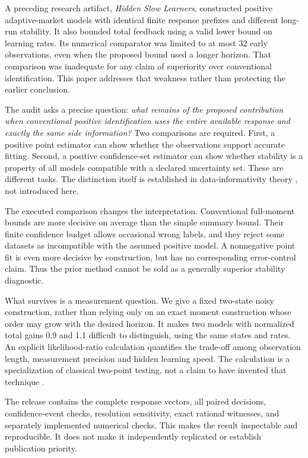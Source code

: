 \documentclass[11pt]{article}
\theoremstyle{remark}\newtheorem{remark}[proposition]{Remark}
\begin{document}
A preceding research artifact, \emph{Hidden Slow Learners}, constructed positive adaptive-market models with identical finite response prefixes and different long-run stability. It also bounded total feedback using a valid lower bound on learning rates. Its numerical comparator was limited to at most 32 early observations, even when the proposed bound used a longer horizon. That comparison was inadequate for any claim of superiority over conventional identification. This paper addresses that weakness rather than protecting the earlier conclusion.

The audit asks a precise question: \emph{what remains of the proposed contribution when conventional positive identification uses the entire available response and exactly the same side information?} Two comparisons are required. First, a positive point estimator can show whether the observations support accurate fitting. Second, a positive confidence-set estimator can show whether stability is a property of all models compatible with a declared uncertainty set. These are different tasks. The distinction itself is established in data-informativity theory \citep{vanwaarde2020}, not introduced here.

The executed comparison changes the interpretation. Conventional full-moment bounds are more decisive on average than the simple summary bound. Their finite confidence budget allows occasional wrong labels, and they reject some datasets as incompatible with the assumed positive model. A nonnegative point fit is even more decisive by construction, but has no corresponding error-control claim. Thus the prior method cannot be sold as a generally superior stability diagnostic.

What survives is a measurement question. We give a fixed two-state noisy construction, rather than relying only on an exact moment construction whose order may grow with the desired horizon. It makes two models with normalized total gains 0.9 and 1.1 difficult to distinguish, using the same states and rates. An explicit likelihood-ratio calculation quantifies the trade-off among observation length, measurement precision and hidden learning speed. The calculation is a specialization of classical two-point testing, not a claim to have invented that technique \citep{polyanskiy2019}.

The release contains the complete response vectors, all paired decisions, confidence-event checks, resolution sensitivity, exact rational witnesses, and separately implemented numerical checks. This makes the result inspectable and reproducible. It does not make it independently replicated or establish publication priority.
\end{document}
